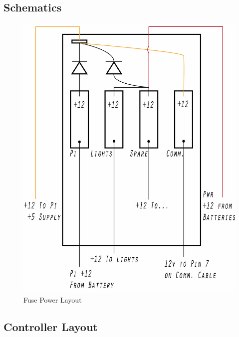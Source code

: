\documentclass[
18pt, %
a4paper, %
oneside, %
headinclude,footinclude, %
]{scrartcl}
\begin{document}

\subsection{Schematics}

\begin{figure}[H]
	\centering 
	\hspace*{-2cm}
	\includegraphics[width=1.1\columnwidth]{Figures/Component_Diagrams/fuse_schematic.jpg}
	\caption[]{Fuse Power Layout} %
\end{figure}



\subsection{Controller Layout}
\end{document}
